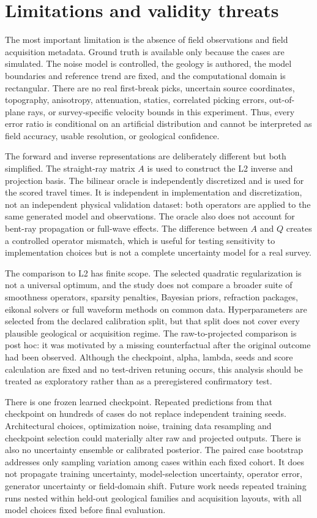 \documentclass[11pt]{article}
\begin{document}
\section{Limitations and validity threats}\label{sec:limitations}
The most important limitation is the absence of field observations and field acquisition metadata. Ground truth is available only because the cases are simulated. The noise model is controlled, the geology is authored, the model boundaries and reference trend are fixed, and the computational domain is rectangular. There are no real first-break picks, uncertain source coordinates, topography, anisotropy, attenuation, statics, correlated picking errors, out-of-plane rays, or survey-specific velocity bounds in this experiment. Thus, every error ratio is conditional on an artificial distribution and cannot be interpreted as field accuracy, usable resolution, or geological confidence.

The forward and inverse representations are deliberately different but both simplified. The straight-ray matrix $A$ is used to construct the L2 inverse and projection basis. The bilinear oracle is independently discretized and is used for the scored travel times. It is independent in implementation and discretization, not an independent physical validation dataset: both operators are applied to the same generated model and observations. The oracle also does not account for bent-ray propagation or full-wave effects. The difference between $A$ and $Q$ creates a controlled operator mismatch, which is useful for testing sensitivity to implementation choices but is not a complete uncertainty model for a real survey.

The comparison to L2 has finite scope. The selected quadratic regularization is not a universal optimum, and the study does not compare a broader suite of smoothness operators, sparsity penalties, Bayesian priors, refraction packages, eikonal solvers or full waveform methods on common data. Hyperparameters are selected from the declared calibration split, but that split does not cover every plausible geological or acquisition regime. The raw-to-projected comparison is post hoc: it was motivated by a missing counterfactual after the original outcome had been observed. Although the checkpoint, alpha, lambda, seeds and score calculation are fixed and no test-driven retuning occurs, this analysis should be treated as exploratory rather than as a preregistered confirmatory test.

There is one frozen learned checkpoint. Repeated predictions from that checkpoint on hundreds of cases do not replace independent training seeds. Architectural choices, optimization noise, training data resampling and checkpoint selection could materially alter raw and projected outputs. There is also no uncertainty ensemble or calibrated posterior. The paired case bootstrap addresses only sampling variation among cases within each fixed cohort. It does not propagate training uncertainty, model-selection uncertainty, operator error, generator uncertainty or field-domain shift. Future work needs repeated training runs nested within held-out geological families and acquisition layouts, with all model choices fixed before final evaluation.
\end{document}
